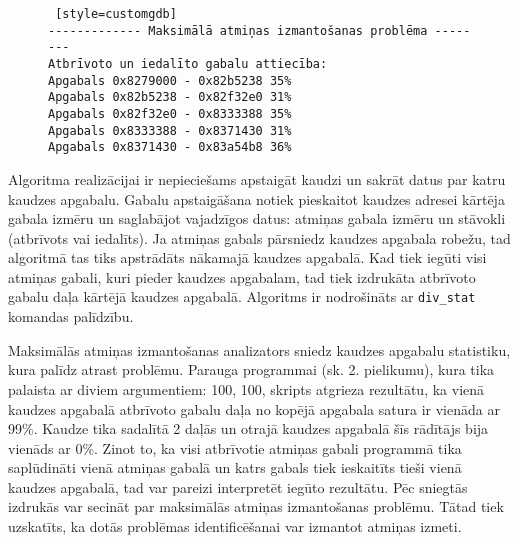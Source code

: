 \begin{figure}[h]
\begin{lstlisting} [style=customgdb]
------------- Maksimālā atmiņas izmantošanas problēma --------
Atbrīvoto un iedalīto gabalu attiecība:
Apgabals 0x8279000 - 0x82b5238 35%
Apgabals 0x82b5238 - 0x82f32e0 31%
Apgabals 0x82f32e0 - 0x8333388 35%
Apgabals 0x8333388 - 0x8371430 31%
Apgabals 0x8371430 - 0x83a54b8 36%
\end{lstlisting}
\caption{\textbf{\fontsize{11}{12}\selectfont {Maksimālā atmiņas izmantošanas rādītājs}}}
\end{figure}

Algoritma realizācijai ir nepieciešams apstaigāt kaudzi un sakrāt datus par katru kaudzes apgabalu.
Gabalu apstaigāšana notiek pieskaitot kaudzes adresei kārtēja gabala izmēru un saglabājot vajadzīgos datus: atmiņas gabala izmēru un stāvokli (atbrīvots vai iedalīts).
Ja atmiņas gabals pārsniedz kaudzes apgabala robežu, tad algoritmā tas tiks apstrādāts nākamajā kaudzes apgabalā.
Kad tiek iegūti visi atmiņas gabali, kuri pieder kaudzes apgabalam, tad tiek izdrukāta atbrīvoto gabalu daļa kārtējā kaudzes apgabalā.
Algoritms ir nodrošināts ar \texttt{div\_stat} komandas palīdzību.

Maksimālās atmiņas izmantošanas analizators sniedz kaudzes apgabalu statistiku, kura palīdz atrast problēmu.
Parauga programmai (sk. 2. pielikumu), kura tika palaista ar diviem argumentiem: 100, 100, skripts atgrieza rezultātu, ka vienā kaudzes apgabalā atbrīvoto gabalu daļa no kopējā apgabala satura ir vienāda ar 99\%.
Kaudze tika sadalītā 2 daļās un otrajā kaudzes apgabalā šīs rādītājs bija vienāds ar 0\%. 
Zinot to, ka visi atbrīvotie atmiņas gabali programmā tika saplūdināti vienā atmiņas gabalā un katrs gabals tiek ieskaitīts tieši vienā kaudzes apgabalā, tad var pareizi interpretēt iegūto rezultātu.
Pēc sniegtās izdrukās var secināt par maksimālās atmiņas izmantošanas problēmu.
Tātad tiek uzskatīts, ka dotās problēmas identificēšanai var izmantot atmiņas izmeti.

